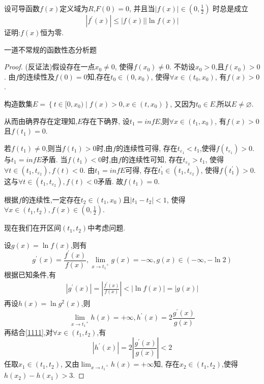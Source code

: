 \documentclass[lang=cn,newtx,10pt,scheme=chinese]{../Template/elegantbook}
\begin{document}
\begin{example}
设可导函数$f(x)$定义域为$R$,$F(0)=0$,
并且当$\left| f\left( x \right) \right|\in \left( 0,\frac{1}{2} \right) $
时总是成立
\begin{equation}
\left| f^{\prime}\left( x \right) \right|\leqslant \left| f\left( x \right) \right|\left| \ln f\left( x \right) \right|
\nonumber
\end{equation}
证明:$f(x)$恒为零.
\end{example}
\begin{note}
一道不常规的函数性态分析题
\end{note}
\begin{proof}
(反证法)假设存在一点$x_0\ne 0$,
使得$f(x_0)\ne 0$.
不妨设$x_0> 0$,且$f(x_0)>0$.
由$f$的连续性及$f(0)=0$知,存在$t_0\in(0,x_0)$,
使得$\forall x\in(t_0,x_0)$,
有$f(x)>0$.

构造数集$E=\left\{ t\in [0,x_0)\mid f\left( x \right) >0,x\in \left( t,x_0 \right) \right\} $,
又因为$t_0\in E$,所以$E \ne \varnothing $.

从而由确界存在定理知,$E$存在下确界,
设$t_1=inf E$,则$\forall x\in (t_1,x_0)$,
有$f(x)>0$且$f(t_1)=0$.

若$f(t_1)\ne 0$,则当$f(t_1)>0$时,由$f$的连续性可得,
存在$t_{\varepsilon_1}<t_1$,使得$f(t_{\varepsilon_1})>0$.
与$t_1=inf E$矛盾.
当$f(t_1)<0$时,由$f$的连续性可知,
存在$t_{\varepsilon_2}>t_1$,
使得$\forall t\in(t_1,t_{\varepsilon_2}),f(t)<0$.
由$t_1=inf E$可得,
存在$t_1^{\prime}\in (t_1,t_{\varepsilon_2})$,
使得$f(t_1^{\prime})>0$.这与$\forall t\in(t_1,t_{\varepsilon_2}),f(t)<0$矛盾.
故$f(t_1)=0$.

根据$f$的连续性,一定存在$t_2\in(t_1,x_0)$且$\left| t_1-t_2 \right|<1$,
使得$\forall x\in (t_1,t_2),f(x)\in(0,\frac{1}{2})$.

现在我们在开区间$(t_1,t_2)$中考虑问题.

设$g(x)=\ln f(x)$,则有
\begin{equation}
g^{\prime}(x)=\frac{f^{\prime}(x)}{f(x)}
,\lim_{x\rightarrow {t_1}^{+}} g\left( x \right) =-\infty ,g\left( x \right) \in \left( -\infty ,-\ln 2 \right) 
\nonumber
\end{equation}
根据已知条件,有
\begin{equation}\label{1111}
\begin{split}
\left| g^{\prime}\left( x \right) \right|=\left| \frac{f^{\prime}\left( x \right)}{f\left( x \right)} \right|<\left| \ln f\left( x \right) \right|=\left| g\left( x \right) \right|
\end{split}
\end{equation}
再设$h(x)=\ln g^2(x)$,则
\begin{equation}
\lim_{x\rightarrow {t_1}^{+}} h\left( x \right) =+\infty
,h^{\prime}(x)=2\frac{g^{\prime}(x)}{g(x)}
\nonumber
\end{equation}
再结合\eqref{1111},对$\forall x\in(t_1,t_2)$,有
\begin{equation}
\left| h^{\prime}(x) \right|=2\left| \frac{g^{\prime}(x)}{g(x)} \right|<2
\nonumber
\end{equation}
任取$x_1\in(t_1,t_2)$,
又由$\lim_{x\rightarrow {t_1}^{+}} h\left( x \right) =+\infty$知,
存在$x_2\in (t_1,t_2)$,使得$h(x_2)-h(x_1)>3$.


\end{proof}
\end{document}
